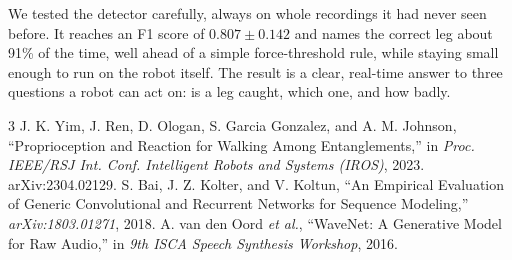 \documentclass[11pt]{article}
\begin{document}
We tested the detector carefully, always on whole recordings it had never seen before. It reaches an
F1 score of $0.807 \pm 0.142$ and names the correct leg about 91\% of the time, well ahead of a simple
force-threshold rule, while staying small enough to run on the robot itself. The result is a clear,
real-time answer to three questions a robot can act on: is a leg caught, which one, and how badly.

\vspace{4pt}
{\footnotesize
\begin{thebibliography}{3}
 J. K. Yim, J. Ren, D. Ologan, S. Garcia Gonzalez, and A. M. Johnson,
``Proprioception and Reaction for Walking Among Entanglements,'' in \textit{Proc. IEEE/RSJ Int. Conf.
Intelligent Robots and Systems (IROS)}, 2023. arXiv:2304.02129.
 S. Bai, J. Z. Kolter, and V. Koltun, ``An Empirical Evaluation of Generic
Convolutional and Recurrent Networks for Sequence Modeling,'' \textit{arXiv:1803.01271}, 2018.
 A. van den Oord \textit{et al.}, ``WaveNet: A Generative Model for Raw Audio,'' in
\textit{9th ISCA Speech Synthesis Workshop}, 2016.
\end{thebibliography}}
\end{document}
